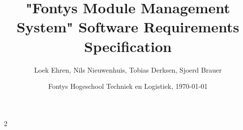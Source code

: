 \documentclass{report}
\begin{document}
	
	\author{Loek Ehren, Nils Nieuwenhuis, Tobias Derksen, Sjoerd Brauer}
	\title{"Fontys Module Management System" Software Requirements Specification}
	\date{Fontys Hogeschool Techniek en Logistiek, \today}
	
	\maketitle
	
	\thispagestyle{empty}
	
	\newpage
	
	\setcounter{page}2
	
	\tableofcontents
	\listoffigures
	\listoftables
	\printglossary[type=\acronymtype,title=List of Abbreviations]

	
	\lhead{\nouppercase{\leftmark}}
	
	
	
	
	
	
	
\end{document}
